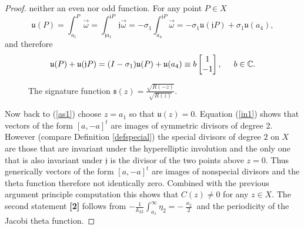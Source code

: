 \documentclass[10pt,oneside,reqno]{amsart}
\numberwithin{equation}{section}
\def\eqref#1{(\ref{#1})}
\begin{document}
\begin{proof}
neither an even nor odd function. For any point $P\in X$
\begin{equation*}
  \mathfrak{u}(P)=\int_{a_1}^P\vec{\omega} = \int_{\mathfrak{j}a_1}^{\mathfrak{j}P}\mathfrak{j}\vec{\omega}=-\sigma_1\int_{a_4}^{\mathfrak{j}P}\vec{\omega}=
  -\sigma_1\mathfrak{u}(\mathfrak{j}P)+\sigma_1\mathfrak{u}(a_4),
\end{equation*}
and therefore
\begin{equation}\label{in1}
  \mathfrak{u}(P)+\mathfrak{u}(\mathfrak{j}P)=(I-\sigma_1)\mathfrak{u}(P)+\mathfrak{u}(a_4)\equiv b\begin{bmatrix}
                                                                                              1\\
-1\\
                                                                                             \end{bmatrix},\hspace{0.5cm}b\in\mathbb{C}.
\end{equation}
\begin{figure}
\resizebox{0.3\textwidth}{!}{}
\caption{The signature function $\mathfrak s(z) = \frac {\sqrt{R(-z)}}{\sqrt{R(z)}}$. }
\label{fraks}
\end{figure}
Now back to \eqref{as1} choose $z=a_1$ so that $\mathfrak{u}(z)=0$. Equation \eqref{in1} shows that vectors of the form $[a,-a]^t$ are images of symmetric 
divisors of degree $2$. However (compare Definition \ref{defspecial}) the special divisors of degree $2$ on $X$ are those that are invariant under the hyperelliptic involution and the only one that is also
invariant under $\mathfrak{j}$ is the divisor of the two points above $z=0$. Thus generically vectors of the form $[a,-a]^t$ are images of nonspecial divisors and the
theta function therefore not identically zero. Combined with the previous argument principle computation this shows that $C(z)\neq 0$ for any $z\in X$. The second statement {\bf [2]} follows from
$
  -\frac{1}{\mathbb{A}_{22}}\int_{a_1}^{\infty}\eta_2 = -\frac{\varkappa_2}{2}
$
and the periodicity of the Jacobi theta function.
\end{proof}
\end{document}
